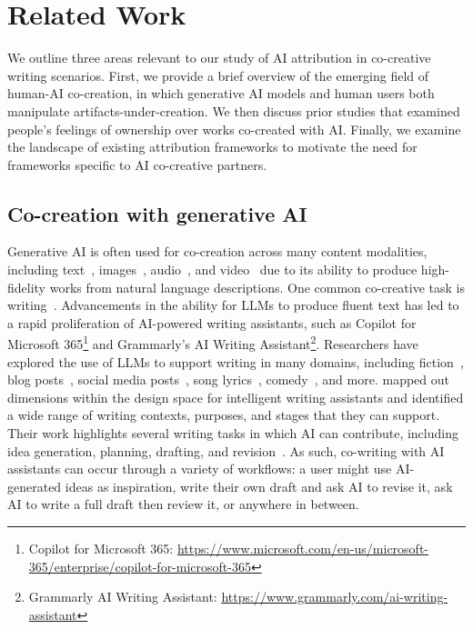 \section{Related Work}
We outline three areas relevant to our study of AI attribution in co-creative writing scenarios. First, we provide a brief overview of the emerging field of human-AI co-creation, in which generative AI models and human users both manipulate artifacts-under-creation. We then discuss prior studies that examined people's feelings of ownership over works co-created with AI. Finally, we examine the landscape of existing attribution frameworks to motivate the need for frameworks specific to AI co-creative partners.

\subsection{Co-creation with generative AI}

Generative AI is often used for co-creation across many content modalities, including text~\cite{wan2024felt, yang2022ai, ding2023mapping, lee2024design}, images~\cite{turchi2023human, fan2024contextcam}, audio~\cite{cao2023comprehensive, ning2024mimosa, louie2020novice}, and video~\cite{wang2024podreels, wang2024reelframer} due to its ability to produce high-fidelity works from natural language descriptions. One common co-creative task is writing~\cite{lee2024design}. Advancements in the ability for LLMs to produce fluent text has led to a rapid proliferation of AI-powered writing assistants, such as Copilot for Microsoft 365\footnote{Copilot for Microsoft 365: \url{https://www.microsoft.com/en-us/microsoft-365/enterprise/copilot-for-microsoft-365}} and Grammarly's AI Writing Assistant\footnote{Grammarly AI Writing Assistant: \url{https://www.grammarly.com/ai-writing-assistant}}. Researchers have explored the use of LLMs to support writing in many domains, including fiction~\cite{calderwood2020novelists, yang2022ai, zhao2023more}, blog posts~\cite{radensky2024let}, social media posts~\cite{lu2024corporate}, song lyrics~\cite{huang2020ai}, comedy~\cite{mirowski2024robot}, and more. \citet{lee2024design} mapped out dimensions within the design space for intelligent writing assistants and identified a wide range of writing contexts, purposes, and stages that they can support. Their work highlights several writing tasks in which AI can contribute, including idea generation, planning, drafting, and revision~\cite{lee2024design}. As such, co-writing with AI assistants can occur through a variety of workflows: a user might use AI-generated ideas as inspiration, write their own draft and ask AI to revise it, ask AI to write a full draft then review it, or anywhere in between. 

